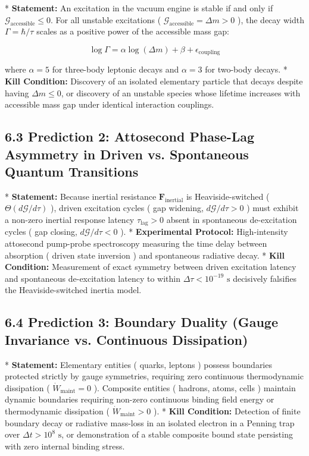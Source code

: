 \documentclass[11pt,a4paper]{article}
\theoremstyle{definition}\newtheorem{definition}{Definition}
\theoremstyle{remark}\newtheorem{remark}{Remark}
\begin{document}
* \textbf{Statement:} An excitation in the vacuum engine is stable if and only if $\mathcal{G}_{\text{accessible}} \le 0$. For all unstable excitations ( $\mathcal{G}_{\text{accessible}} = \Delta m > 0$ ), the decay width $\Gamma = \hbar / \tau$ scales as a positive power of the accessible mass gap:


\begin{equation}
\log \Gamma = \alpha \log(\Delta m) + \beta + \epsilon_{\text{coupling}}
\end{equation}


where $\alpha = 5$ for three-body leptonic decays and $\alpha = 3$ for two-body decays.
* \textbf{Kill Condition:} Discovery of an isolated elementary particle that decays despite having $\Delta m \le 0$, or discovery of an unstable species whose lifetime increases with accessible mass gap under identical interaction couplings.
\subsection{6.3 Prediction 2: Attosecond Phase-Lag Asymmetry in Driven vs. Spontaneous Quantum Transitions}

* \textbf{Statement:} Because inertial resistance $\mathbf{F}_{\text{inertial}}$ is Heaviside-switched ( $\Theta(d\mathcal{G}/d\tau)$ ), driven excitation cycles ( gap widening, $d\mathcal{G}/d\tau > 0$ ) must exhibit a non-zero inertial response latency $\tau_{\text{lag}} > 0$ absent in spontaneous de-excitation cycles ( gap closing, $d\mathcal{G}/d\tau < 0$ ).
* \textbf{Experimental Protocol:} High-intensity attosecond pump-probe spectroscopy measuring the time delay between absorption ( driven state inversion ) and spontaneous radiative decay.
* \textbf{Kill Condition:} Measurement of exact symmetry between driven excitation latency and spontaneous de-excitation latency to within $\Delta \tau < 10^{-19}\text{ s}$ decisively falsifies the Heaviside-switched inertia model.
\subsection{6.4 Prediction 3: Boundary Duality (Gauge Invariance vs. Continuous Dissipation)}

* \textbf{Statement:} Elementary entities ( quarks, leptons ) possess boundaries protected strictly by gauge symmetries, requiring zero continuous thermodynamic dissipation ( $\dot{W}_{\text{maint}} = 0$ ). Composite entities ( hadrons, atoms, cells ) maintain dynamic boundaries requiring non-zero continuous binding field energy or thermodynamic dissipation ( $\dot{W}_{\text{maint}} > 0$ ).
* \textbf{Kill Condition:} Detection of finite boundary decay or radiative mass-loss in an isolated electron in a Penning trap over $\Delta t > 10^8\text{ s}$, or demonstration of a stable composite bound state persisting with zero internal binding stress.
\end{document}
